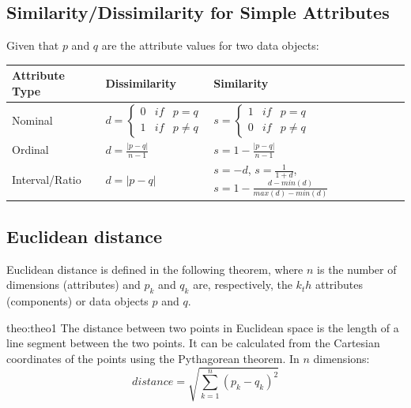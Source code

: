 \subsection{Similarity/Dissimilarity for Simple Attributes}
Given that $p$ and $q$ are the attribute values for two data objects:
\begin{center}
    \begin{table}[H]
        \begin{tabular}{l|l|l}
            Attribute Type &
            Dissimilarity &
            Similarity \\ \hline \hline

            Nominal &
            $d = \left\{\begin{matrix} 0 & if & p=q\\  1 & if & p \neq q \end{matrix}\right.$ &
            $s = \left\{\begin{matrix} 1 & if & p=q\\  0 & if & p \neq q \end{matrix}\right.$ \\ \hline

            Ordinal &
            $d = \frac{|p-q|}{n-1}$&
            $s = 1 - \frac{|p-q|}{n-1}$ \\ \hline

            Interval/Ratio &
            $d = |p-q|$&
            $s = -d$, $s = \frac{1}{1+d}$, $s = 1- \frac{d- min(d)}{max(d)-min(d)}$
        \end{tabular}
    \end{table}
\end{center}

\subsection{Euclidean distance}

Euclidean distance is defined in the following theorem, where $n$ 
is the number of dimensions (attributes) and $p_k$ and $q_k$ are, respectively,
the $k_th$ attributes (components) or data objects $p$ and $q$.

\begin{theo}{theo:theo1}
\label{eq:euclidean-distance}
The distance between two points in Euclidean space 
is the length of a line segment between the two points. It can be calculated 
from the Cartesian coordinates of the points using the Pythagorean theorem. 
In $n$ dimensions:
    \[
        distance = \sqrt{\sum_{k=1}^{n}(p_k-q_k)^2}
    \]
\end{theo}

